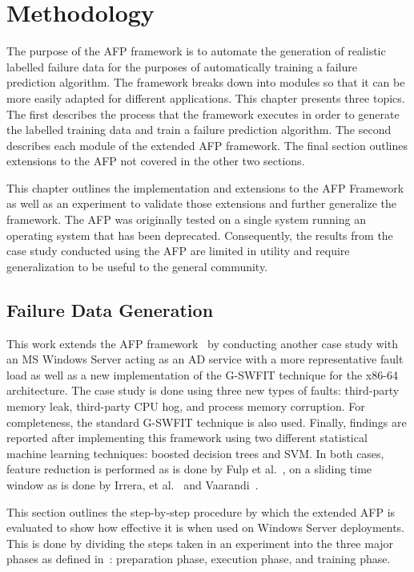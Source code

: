 \chapter{Methodology} \label{chapter3}
The purpose of the \ac{AFP} framework is to automate the generation of
realistic labelled failure data for the purposes of automatically training a
failure prediction algorithm.  The framework breaks down into modules so that
it can be more easily adapted for different applications.  This chapter
presents three topics.  The first describes the process that the framework
executes in order to generate the labelled training data and train a failure
prediction algorithm.  The second describes each module of the extended
\ac{AFP} framework.  The final section outlines extensions to the \ac{AFP} not
covered in the other two sections.

This chapter outlines the implementation and extensions to the \ac{AFP}
Framework~\cite{irrera2015} as well as an experiment to validate those
extensions and further generalize the framework.  The \ac{AFP} was originally tested
on a single system running an operating system that has been deprecated.
Consequently, the results from the case study conducted using the \ac{AFP} are
limited in utility and require generalization to be useful to the general
community.

\section{Failure Data Generation} \label{sec:generation}
This work extends the \ac{AFP} framework~\cite{irrera2015} by conducting
another case study with an \ac{MS} Windows Server acting as an \ac{AD} service
with a more representative fault load as well as a new implementation of the
\ac{G-SWFIT} technique for the x86-64 architecture.  The case study is done
using three new types of faults: third-party memory leak, third-party \ac{CPU}
hog, and process memory corruption.  For completeness, the standard
\ac{G-SWFIT} technique is also used.  Finally, findings are reported after
implementing this framework using two different statistical machine learning
techniques: boosted decision trees and \ac{SVM}.  In both cases, feature
reduction is performed as is done by Fulp et al.~\cite{fulp2008}, on a sliding
time window as is done by Irrera, et al.~\cite{irrera2013a} and
Vaarandi~\cite{vaarandi2002}.

This section outlines the step-by-step procedure by which the extended \ac{AFP}
is evaluated to show how effective it is when used on Windows Server
deployments.  This is done by dividing the steps taken in an experiment into
the three major phases as defined in~\cite{irrera2015}: preparation phase,
execution phase, and training phase.

